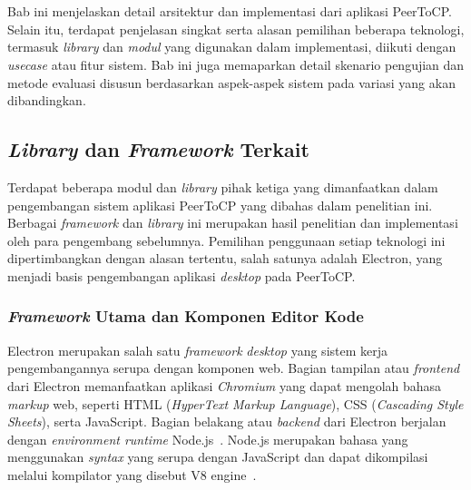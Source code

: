 \chapter{\babEmpat}
\label{bab:4}

Bab ini menjelaskan detail arsitektur dan implementasi dari aplikasi PeerToCP. Selain itu, terdapat penjelasan singkat serta alasan pemilihan beberapa teknologi, termasuk \textit{library} dan \textit{modul} yang digunakan dalam implementasi, diikuti dengan \textit{usecase} atau fitur sistem. Bab ini juga memaparkan detail skenario pengujian dan metode evaluasi disusun berdasarkan aspek-aspek sistem pada variasi yang akan dibandingkan.

\section{\textit{Library} dan \textit{Framework} Terkait}

Terdapat beberapa modul dan \textit{library} pihak ketiga yang dimanfaatkan dalam pengembangan sistem aplikasi PeerToCP yang dibahas dalam penelitian ini. Berbagai \textit{framework} dan \textit{library} ini merupakan hasil penelitian dan implementasi oleh para pengembang sebelumnya. Pemilihan penggunaan setiap teknologi ini dipertimbangkan dengan alasan tertentu, salah satunya adalah Electron, yang menjadi basis pengembangan aplikasi \textit{desktop} pada PeerToCP.

\subsection{\textit{Framework} Utama dan Komponen Editor Kode}

Electron merupakan salah satu \textit{framework} \textit{desktop} yang sistem kerja pengembangannya serupa dengan komponen web. Bagian tampilan atau \textit{frontend} dari Electron memanfaatkan aplikasi \textit{Chromium} yang dapat mengolah bahasa \textit{markup} web, seperti HTML (\textit{HyperText Markup Language}), CSS (\textit{Cascading Style Sheets}), serta JavaScript. Bagian belakang atau \textit{backend} dari Electron berjalan dengan \textit{environment runtime} Node.js~\citep{kredpattanakul2018transforming, miglanielectron}. Node.js merupakan bahasa yang menggunakan \textit{syntax} yang serupa dengan JavaScript dan dapat dikompilasi melalui kompilator yang disebut V8 engine~\citep{tilkov2010node}.

